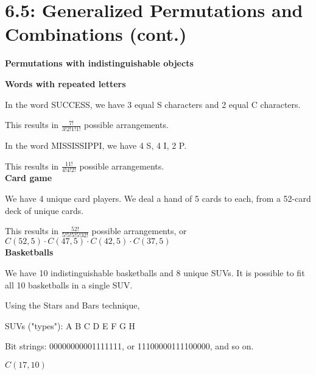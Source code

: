 \documentclass[english]{exam}
\begin{document}
	
    \section{6.5: Generalized Permutations and Combinations (cont.)}
    
    \textbf{{\large{Permutations with indistinguishable objects}}}\\
    
    \normalfont
    
    \textbf{Words with repeated letters}
    
    In the word SUCCESS, we have 3 equal S characters and 2 equal C characters.
    
    This results in $\frac{7!}{3!2!1!1!}$ possible arrangements.
    
    In the word MISSISSIPPI, we have 4 S, 4 I, 2 P.
    
    This results in $\frac{11!}{4!4!2!}$ possible arrangements.\\
    
    \textbf{Card game}
    
    We have 4 unique card players. We deal a hand of 5 cards to each, from a 52-card deck of unique cards.
    
    This results in $\frac{52!}{5!5!5!5!32!}$ possible arrangements, or $C(52,5) \cdot C(47,5) \cdot C(42,5) \cdot C(37,5)$\\
    
    \textbf{Basketballs}
    
    We have 10 indistinguishable basketballs and 8 unique SUVs. It is possible to fit all 10 basketballs in a single SUV.
    
    Using the Stars and Bars technique,
    
    SUVs ("types"): A B C D E F G H
    
    Bit strings: 00000000001111111, or 11100000111100000, and so on.
    
    $C(17,10)$
    
    
\end{document}

